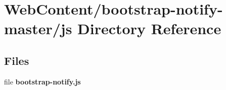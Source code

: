 \section{Web\-Content/bootstrap-\/notify-\/master/js Directory Reference}
\label{dir_e777e4beb0b17a60ecb9fb7e2497293b}
\subsection*{Files}
\begin{DoxyCompactItemize}
\item 
file {\bf bootstrap-\/notify.\-js}
\end{DoxyCompactItemize}
